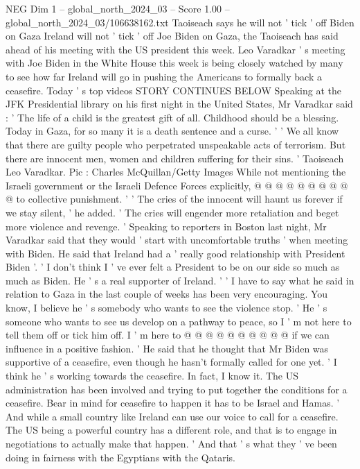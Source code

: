 \begin{textsample}{NEG Dim 1 – global\_north\_2024\_03 – Score 1.00 – global\_north\_2024\_03/106638162.txt}  \label{ex:f1_neg_398}
Taoiseach says he will not ' tick ' off Biden on Gaza Ireland will not ' tick ' off Joe Biden on Gaza, the Taoiseach has said ahead of his meeting with the US president this week.
Leo Varadkar ' s meeting with Joe Biden in the White House this week is being closely watched by many to see how far Ireland will go in pushing the Americans to formally back a ceasefire.
Today ' s top videos STORY CONTINUES BELOW Speaking at the JFK Presidential library on his first night in the United States, Mr Varadkar said : ' The life of a child is the greatest gift of all.
Childhood should be a blessing.
Today in Gaza, for so many it is a death sentence and a curse. ' ' We all know that there are guilty people who perpetrated unspeakable acts of terrorism.
But there are innocent men, women and children suffering for their sins. ' Taoiseach Leo Varadkar.
Pic : Charles McQuillan/Getty Images While not mentioning the Israeli government or the Israeli Defence Forces explicitly, @ @ @ @ @ @ @ @ @ @ to collective punishment. ' ' The cries of the innocent will haunt us forever if we stay silent, ' he added. ' The cries will engender more retaliation and beget more violence and revenge. ' Speaking to reporters in Boston last night, Mr Varadkar said that they would ' start with uncomfortable truths ' when meeting with Biden.
He said that Ireland had a ' really good relationship with President Biden '. ' I don't think I ' ve ever felt a President to be on our side so much as much as Biden.
He ' s a real supporter of Ireland. ' ' I have to say what he said in relation to Gaza in the last couple of weeks has been very encouraging.
You know, I believe he ' s somebody who wants to see the violence stop. ' He ' s someone who wants to see us develop on a pathway to peace, so I ' m not here to tell them off or tick him off.
I ' m here to @ @ @ @ @ @ @ @ @ @ if we can influence in a positive fashion. ' He said that he thought that Mr Biden was supportive of a ceasefire, even though he hasn't formally called for one yet. ' I think he ' s working towards the ceasefire.
In fact, I know it.
The US administration has been involved and trying to put together the conditions for a ceasefire.
Bear in mind for ceasefire to happen it has to be Israel and Hamas. ' And while a small country like Ireland can use our voice to call for a ceasefire.
The US being a powerful country has a different role, and that is to engage in negotiations to actually make that happen. ' And that ' s what they ' ve been doing in fairness with the Egyptians with the Qataris.

\end{textsample}
